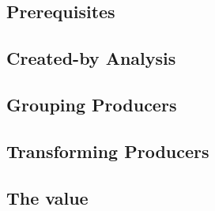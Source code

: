 \documentclass[main.tex]{subfiles}
\begin{document}
	
	
	\subsection{Prerequisites}
	
	
	\subsection{Created-by Analysis}
	
	\subsection{Grouping Producers}
	
	\subsection{Transforming Producers}
	
	\subsection{The  value}
	
\end{document}

